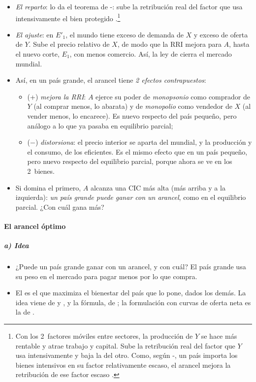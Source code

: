 \documentclass[11pt]{article}
\begin{document}
\begin{itemize}
\item \emph{El reparto}: lo da el teorema de -: sube la retribución real del factor que usa intensivamente el bien protegido .\footnote{Con los 2~factores móviles entre sectores, la producción de $Y$ se hace más rentable y atrae trabajo y capital. Sube la retribución real del factor que $Y$ usa intensivamente y baja la del otro. Como, según -, un país importa los bienes intensivos en su factor relativamente escaso, el arancel mejora la retribución de ese factor escaso .}
\item \emph{El ajuste}: en $E'_1$, el mundo tiene exceso de demanda de $X$ y exceso de oferta de $Y$. Sube el precio relativo de $X$, de modo que la RRI mejora para $A$, hasta el nuevo corte, $E_1$, con menos comercio. Así, la ley de  cierra el mercado mundial.
\item Así, en un país grande, el arancel tiene \emph{2 efectos contrapuestos}:
  \begin{itemize}
  \item (+) \emph{mejora la RRI}: $A$ ejerce su poder de \emph{monopsonio} como comprador de $Y$ (al comprar menos, lo abarata) y de \emph{monopolio} como vendedor de $X$ (al vender menos, lo encarece). Es nuevo respecto del país pequeño, pero análogo a lo que ya pasaba en equilibrio parcial;
  \item ($-$) \emph{distorsiona}: el precio interior se aparta del mundial, y la producción y el consumo, de los eficientes. Es el mismo efecto que en un país pequeño, pero nuevo respecto del equilibrio parcial, porque ahora se ve en los 2~bienes.
  \end{itemize}
\item Si domina el primero, $A$ alcanza una CIC más alta (más arriba y a la izquierda): \emph{un país grande puede ganar con un arancel}, como en el equilibrio parcial. ¿Con cuál gana más?
\end{itemize}

\paragraph{El arancel óptimo}

\subparagraph{a) Idea}

\begin{itemize}
\item ¿Puede un país grande ganar con un arancel, y con cuál? El país grande usa su peso en el mercado para pagar menos por lo que compra.
\item El  es el que maximiza el bienestar del país que lo pone, dados los demás. La idea viene de  y , y la fórmula, de \textcite{Bickerdike1906Theory}; la formulación con curvas de oferta neta es la de \textcite{Johnson1953Optimum}.
\end{itemize}
\end{document}
